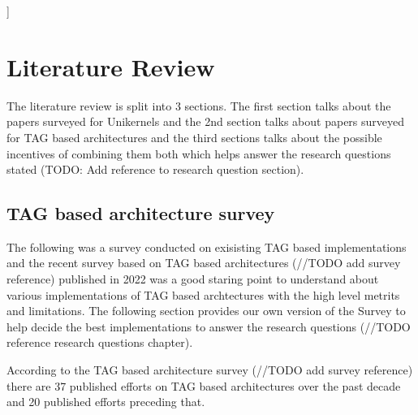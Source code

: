 ]%

\chapter{Literature Review}  %

\ifpdf
    \graphicspath{{LiteratureReview/Figs/Raster/}{LiteratureReview/Figs/PDF/}{LiteratureReview/Figs/}}
\else
    \graphicspath{{LiteratureReview/Figs/Vector/}{LiteratureReview/Figs/}}
\fi


The literature review is split into 3 sections. The first section talks about the papers surveyed 
for Unikernels and the 2nd section talks about papers surveyed for TAG based architectures and 
the third sections talks about the possible incentives of combining them both which helps 
answer the research questions stated (TODO: Add reference to research question section). 

\section[TAG based architecture survey]{TAG based architecture survey}   
The following was a survey conducted on exisisting TAG based implementations and the 
recent survey based on TAG based architectures (//TODO add survey reference) published
in 2022 was a good staring point to understand about various implementations of TAG
based archtectures with the high level metrits and limitations. The following section 
provides our own version of the Survey to help decide the best implementations 
to answer the research questions (//TODO reference research questions chapter). 
 
According to the TAG based architecture survey (//TODO add survey reference) there are 37 published
efforts on TAG based architectures over the past decade and 20 published efforts preceding that. 

